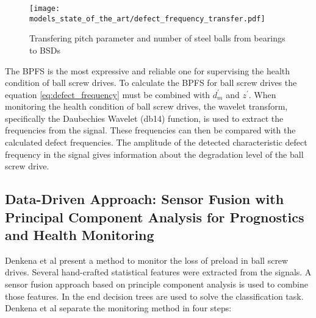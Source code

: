 \begin{figure}[H]
  \centering
  \texttt{[image: models\_state\_of\_the\_art/defect\_frequency\_transfer.pdf]}
  \caption{Transfering pitch parameter and number of steel balls from bearings to BSDs \cite{Lee2015}}
  \label{fig:defect_frequency_transfer}
\end{figure}


The BPFS is the most expressive and reliable one for supervising the health condition of ball screw drives. To calculate the BPFS for ball screw drives the equation \ref{eq:defect_frequency} must be combined with $d_{m}^{'}$ and $z^{'}$. When monitoring the health condition of ball screw drives, the wavelet transform, specifically the Daubechies Wavelet (db14) function, is used to extract the frequencies from the signal. These frequencies can then be compared with the calculated defect frequencies. The amplitude of the detected characteristic defect frequency in the signal gives information about the degradation level of the ball screw drive.

\subsection{Data-Driven Approach: Sensor Fusion with Principal Component Analysis for Prognostics and Health Monitoring }

Denkena et al \cite{Denkena2021} present a method to monitor the loss of preload in ball screw drives. Several hand-crafted statistical features were extracted from the signals. A sensor fusion approach based on principle component analysis is used to combine those features. In the end decision trees are used to solve the classification task. Denkena et al separate the monitoring method in four steps:

